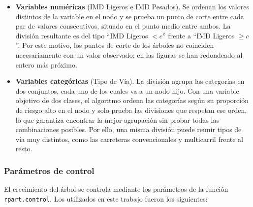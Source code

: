 \documentclass[twoside,a4paper,12pt,onecolumn,openany]{book}
\begin{document}
\begin{itemize}
    \item \textbf{Variables numéricas} (IMD Ligeros e IMD Pesados). Se ordenan los valores distintos de la variable en el nodo y se prueba un punto de corte entre cada par de valores consecutivos, situado en el punto medio entre ambos. La división resultante es del tipo ``IMD Ligeros $< c$'' frente a ``IMD Ligeros $\geq c$''. Por este motivo, los puntos de corte de los árboles no coinciden necesariamente con un valor observado; en las figuras se han redondeado al entero más próximo.
    \item \textbf{Variables categóricas} (Tipo de Vía). La división agrupa las categorías en dos conjuntos, cada uno de los cuales va a un nodo hijo. Con una variable objetivo de dos clases, el algoritmo ordena las categorías según su proporción de riesgo alto en el nodo y solo prueba las divisiones que respetan ese orden, lo que garantiza encontrar la mejor agrupación sin probar todas las combinaciones posibles. Por ello, una misma división puede reunir tipos de vía muy distintos, como las carreteras convencionales y multicarril frente al resto.
\end{itemize}
 
\subsubsection*{Parámetros de control}
 
El crecimiento del árbol se controla mediante los parámetros de la función \texttt{rpart.control}. Los utilizados en este trabajo fueron los siguientes:
 
\end{document}
